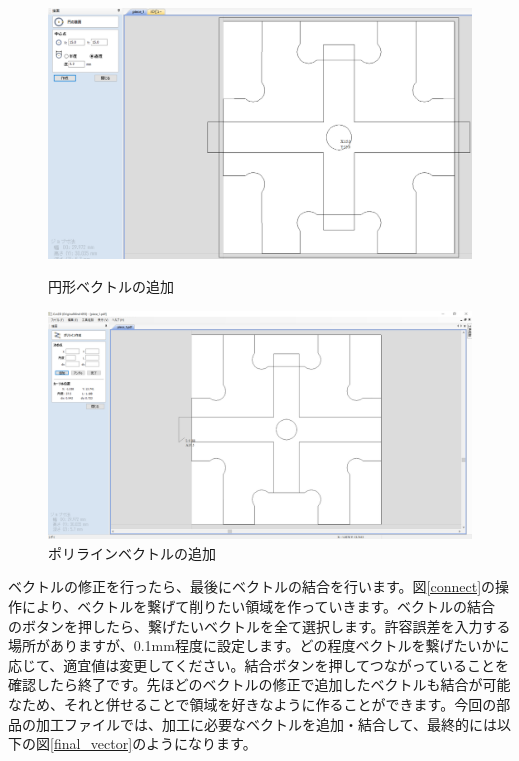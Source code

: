 \documentclass[b5paper, 9pt, twocolumn, titlepage,openany]{jsbook}%
\begin{document}
\begin{figure}[tbh]
  \begin{center}
    \begin{minipage}{1.0\columnwidth}
      \includegraphics[width=\columnwidth]{circle_trim.png}
    \end{minipage}
    \caption{円形ベクトルの追加    \label{circle_vector}}
    \begin{minipage}{1.0\columnwidth}
      \includegraphics[width=\columnwidth]{polyline.png}
    \end{minipage}
    \caption{ポリラインベクトルの追加    \label{polyline_vector}}
  \end{center}
\end{figure}


\clearpage
ベクトルの修正を行ったら、最後にベクトルの結合を行います。図\ref{connect}の操作により、ベクトルを繋げて削りたい領域を作っていきます。ベクトルの結合 のボタンを押したら、繋げたいベクトルを全て選択します。許容誤差を入力する場所がありますが、0.1mm程度に設定します。どの程度ベクトルを繋げたいかに応じて、適宜値は変更してください。結合ボタンを押してつながっていることを確認したら終了です。先ほどのベクトルの修正で追加したベクトルも結合が可能なため、それと併せることで領域を好きなように作ることができます。今回の部品の加工ファイルでは、加工に必要なベクトルを追加・結合して、最終的には以下の図\ref{final_vector}のようになります。\\
\end{document}
